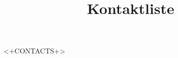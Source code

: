 \documentclass[danish,a4paper,11pt]{article}
\title{Kontaktliste}
\begin{document}
\maketitle

<+CONTACTS+>
\end{document}
